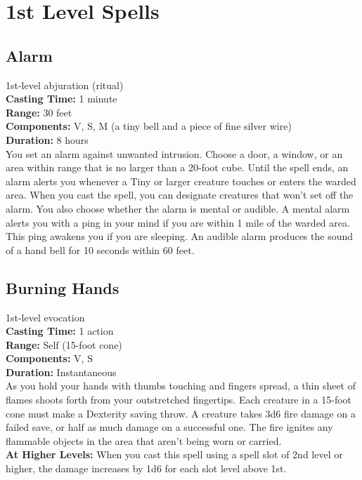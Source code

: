 \documentclass[11pt, A4paper, english]{article}
\begin{document}
	\section{1st Level Spells}
		\subsection{Alarm}
1st-level abjuration (ritual) \\
\textbf{Casting Time:} 1 minute \\
\textbf{Range:} 30 feet \\
\textbf{Components:} V, S, M (a tiny bell and a piece of fine silver wire) \\
\textbf{Duration:} 8 hours \\
You set an alarm against unwanted intrusion. Choose a door, a window, or an area within range that is no larger than a 20-foot cube. Until the spell ends, an alarm alerts you whenever a Tiny or larger creature touches or enters the warded area. When you cast the spell, you can designate creatures that won't set off the alarm. You also choose whether the alarm is mental or audible. A mental alarm alerts you with a ping in your mind if you are within 1 mile of the warded area. This ping awakens you if you are sleeping. An audible alarm produces the sound of a hand bell for 10 seconds within 60 feet.

		\subsection{Burning Hands}
1st-level evocation \\
\textbf{Casting Time:} 1 action \\
\textbf{Range:} Self (15-foot cone) \\
\textbf{Components:} V, S \\
\textbf{Duration:} Instantaneous \\
As you hold your hands with thumbs touching and fingers spread, a thin sheet of flames shoots forth from your outstretched fingertips. Each creature in a 15-foot cone must make a Dexterity saving throw. A creature takes 3d6 fire damage on a failed save, or half as much damage on a successful one. The fire ignites any flammable objects in the area that aren't being worn or carried. \\
\textbf{At Higher Levels:} When you cast this spell using a spell slot of 2nd level or higher, the damage increases by 1d6 for each slot level above  1st.
\end{document}
